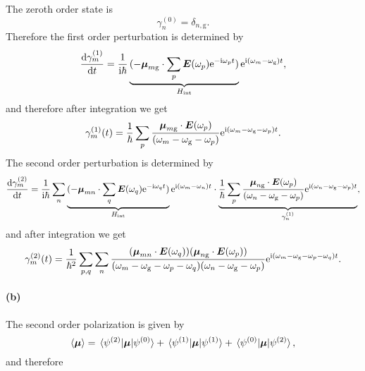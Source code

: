 \documentclass[hyperref, a4paper]{article}
\newcommand*{\ii}{\mathrm{i}}
\newcommand*{\ee}{\mathrm{e}}
\newcommand*{\omegag}{\omega_{\text{g}}}
\begin{document}
The zeroth order state is  
\begin{equation}
    \gamma^{(0)}_n = \delta_{n, \text{g}} .
\end{equation}
Therefore the first order perturbation is determined by 
\begin{equation}
    \dv{\gamma_m^{(1)}}{t} = \frac{1}{\ii \hbar} 
    \underbrace{
        (- \vb*{\mu}_{m \text{g}} \cdot \sum_p \vb*{E}(\omega_p) \ee^{- \ii \omega_p t}) 
    }_{H_{\text{int}}}
    \ee^{\ii (\omega_m - \omegag) t} ,
\end{equation}
and therefore after integration we get 
\begin{equation}
    \gamma_m^{(1)}(t) = \frac{1}{\hbar} \sum_p \frac{\vb*{\mu}_{m \text{g}} \cdot \vb*{E}(\omega_p)}{(\omega_m - \omegag - \omega_p)} \ee^{\ii (\omega_m - \omegag - \omega_p) t}.
\end{equation}
The second order perturbation is determined by 
\begin{equation}
    \dv{\gamma_m^{(2)}}{t} = \frac{1}{\ii \hbar} \sum_n
    \underbrace{
        (- \vb*{\mu}_{m n} \cdot \sum_q \vb*{E}(\omega_q) \ee^{- \ii \omega_q t}) 
    }_{H_{\text{int}}}
    \ee^{\ii (\omega_m - \omega_n) t} 
    \cdot \underbrace{\frac{1}{\hbar} \sum_p \frac{\vb*{\mu}_{n \text{g}} \cdot \vb*{E}(\omega_p)}{(\omega_n - \omegag - \omega_p)} \ee^{\ii (\omega_n - \omegag - \omega_p) t}}_{\gamma_n^{(1)}} ,
\end{equation}
and after integration we get 
\begin{equation}
    \gamma_m^{(2)}(t) = \frac{1}{\hbar^2} \sum_{p, q} \sum_n
    \frac{
        (\vb*{\mu}_{mn} \cdot \vb*{E}(\omega_q)) (\vb*{\mu}_{n \text{g}} \cdot \vb*{E}(\omega_p))
    }{
        (\omega_m - \omegag - \omega_p - \omega_q)
        (\omega_n - \omegag - \omega_p)
    } \ee^{\ii (\omega_m - \omegag - \omega_p - \omega_q) t}.
\end{equation}

\paragraph*{(b)} The second order polarization is given by 
\begin{equation}
    \expval{\vb*{\mu}} = \mel*{\psi^{(2)}}{\vb*{\mu}}{\psi^{(0)}} + 
    \mel*{\psi^{(1)}}{\vb*{\mu}}{\psi^{(1)}}
    + \mel*{\psi^{(0)}}{\vb*{\mu}}{\psi^{(2)}},
\end{equation}
and therefore 
\end{document}
